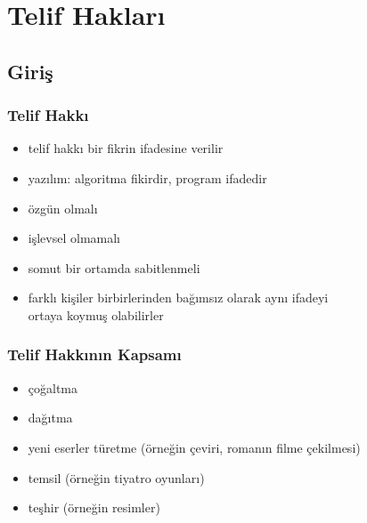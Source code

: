\documentclass[dvipsnames]{beamer}
\theoremstyle{plain}
\begin{document}
\section{Telif Hakları}

\subsection{Giriş}

\begin{frame}
  \frametitle{Telif Hakkı}

  \begin{itemize}
    \item telif hakkı bir fikrin \alert{ifadesine} verilir
    \item yazılım: algoritma fikirdir, program ifadedir

    \pause
    \medskip
    \item özgün olmalı
    \item işlevsel olmamalı
    \item somut bir ortamda sabitlenmeli

    \pause
    \medskip
    \item farklı kişiler birbirlerinden bağımsız olarak aynı ifadeyi\\
      ortaya koymuş olabilirler
  \end{itemize}
\end{frame}

\begin{frame}
  \frametitle{Telif Hakkının Kapsamı}

  \begin{itemize}
    \item çoğaltma
    \item dağıtma
    \item yeni eserler türetme (örneğin çeviri, romanın filme çekilmesi)
    \item temsil (örneğin tiyatro oyunları)
    \item teşhir (örneğin resimler)
  \end{itemize}
\end{frame}
\end{document}
